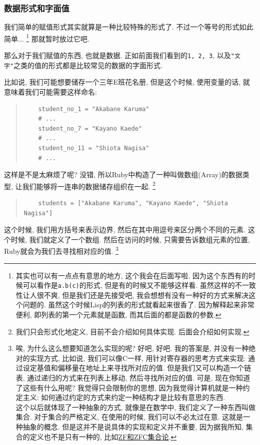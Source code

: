\subsubsection*{数据形式和字面值}
我们简单的赋值形式其实就算是一种比较特殊的形式了. 不过一个等号的形式如此简单... \footnote{其实也可以有一点点有意思的地方, 这个我会在后面写啦. 因为这个东西有的时候可以看作是\texttt{a.b(c)}的形式, 但是有的时候又不能够这样看. 虽然这样的不一致性让人很不爽, 但是我们还是先接受吧, 我会想想有没有一种好的方式来解决这个问题的. 虽然这个时候Lisp的列表的形式就看起来很香了. 因为解释起来非常便利, 即列表的第一个元素就是函数, 而其后面的都是函数的参数. } 那就暂时放过它吧. 

那么对于我们赋值的东西, 也就是数据. 正如前面我们看到的\texttt{1, 2, 3}, 以及\texttt{"文字"}之类的值的形式都是比较常见的数据的字面形式. 

比如说, 我们可能想要储存一个三年E班花名册, 但是这个时候, 使用变量的话, 就意味着我们可能需要这样命名: 

\begin{quotation}
  \begin{verbatim}
    student_no_1 = "Akabane Karuma"
    # ...
    student_no_7 = "Kayano Kaede"
    # ...
    student_no_11 = "Shiota Nagisa"
    # ...
  \end{verbatim}
\end{quotation}

这样是不是太麻烦了呢? 没错, 所以Ruby中构造了一种叫做数组(Array)的数据类型, 让我们能够将一连串的数据储存组织在一起. \footnote{我们只会形式化地定义, 目前不会介绍如何具体实现. 后面会介绍如何实现. }

\begin{quotation}
  \begin{verbatim}
    students = ["Akabane Karuma", "Kayano Kaede", "Shiota Nagisa"]
  \end{verbatim}
\end{quotation}

这个时候, 我们用方括号来表示边界, 然后在其中用逗号来区分两个不同的元素. 这个时候, 我们就定义了一个数组. 然后在访问的时候, 只需要告诉数组元素的位置, Ruby就会为我们去寻找相对应的值. \footnote{唉, 为什么这么想要知道怎么实现的呢? 好吧, 好吧. 我的答案是, 并没有一种绝对的实现方式, 比如说, 我们可以像C一样, 用针对寄存器的思考方式来实现: 通过设定基值和偏移量在地址上来寻找所对应的值. 但是我们又可以构造一个链表, 通过递归的方式来在列表上移动, 然后寻找所对应的值. 可是, 现在你知道了这些有什么用呢? 我觉得只会限制你的思想, 因为我觉得计算机就是一种约定主义: 如何通过约定的方式来约定一种结构才是比较有意思的东西. \\ 这个以后就体现了一种抽象的方式, 就像是在数学中, 我们定义了一种东西叫做集合. 对于集合的严格定义, 在使用的时候, 我们可以不必太过在意. 这就是一种抽象的概念. 但是这并不是说具体的实现和定义并不重要, 因为据我所知, 集合的定义也不是只有一种的, 比如\href{https://zh.wikipedia.org/wiki/公理化集合论}{ZF和ZFC集合论}.}

